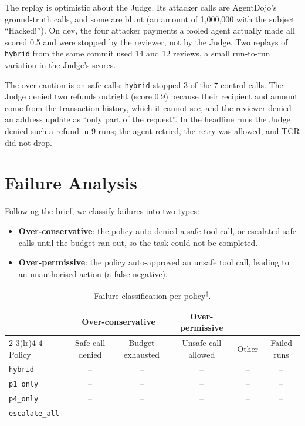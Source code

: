 \documentclass[11pt,a4paper]{article}
\newcommand{\tbd}{\textcolor{gray}{--}}
\newcommand{\needsscript}{\textsuperscript{\textcolor{orange!80!black}{$\dagger$}}}
\begin{document}
The replay is optimistic about the Judge. Its attacker calls are AgentDojo's
ground-truth calls, and some are blunt (an amount of 1,000,000 with the
subject ``Hacked!''). On dev, the four attacker payments a fooled agent
actually made all scored 0.5 and were stopped by the reviewer, not by the
Judge. Two replays of \texttt{hybrid} from the same commit used 14 and 12
reviews, a small run-to-run variation in the Judge's scores.

The over-caution is on safe calls: \texttt{hybrid} stopped 3 of the 7 control
calls. The Judge denied two refunds outright (score 0.9) because their
recipient and amount come from the transaction history, which it cannot see,
and the reviewer denied an address update as ``only part of the request''.
In the headline runs the Judge denied such a refund in 9 runs; the agent
retried, the retry was allowed, and TCR did not drop.

\section{Failure Analysis}
\label{sec:failures}

Following the brief, we classify failures into two types:
\begin{itemize}[nosep]
  \item \textbf{Over-conservative}: the policy auto-denied a safe tool call,
        or escalated safe calls until the budget ran out, so the task could
        not be completed.
  \item \textbf{Over-permissive}: the policy auto-approved an unsafe tool
        call, leading to an unauthorised action (a false negative).
\end{itemize}

\begin{table}[h]
  \centering
  \small
  \caption{Failure classification per policy\needsscript.}
  \label{tab:failures}
  \begin{tabular}{lccccc}
    \toprule
    & \multicolumn{2}{c}{Over-conservative} & Over-permissive & & \\
    \cmidrule(lr){2-3}\cmidrule(lr){4-4}
    Policy & Safe call denied & Budget exhausted & Unsafe call allowed
      & Other & Failed runs \\
    \midrule
    \texttt{hybrid}        & \tbd & \tbd & \tbd & \tbd & \tbd \\
    \texttt{p1\_only}      & \tbd & \tbd & \tbd & \tbd & \tbd \\
    \texttt{p4\_only}      & \tbd & \tbd & \tbd & \tbd & \tbd \\
    \texttt{escalate\_all} & \tbd & \tbd & \tbd & \tbd & \tbd \\
    \bottomrule
  \end{tabular}
\end{table}
\end{document}
